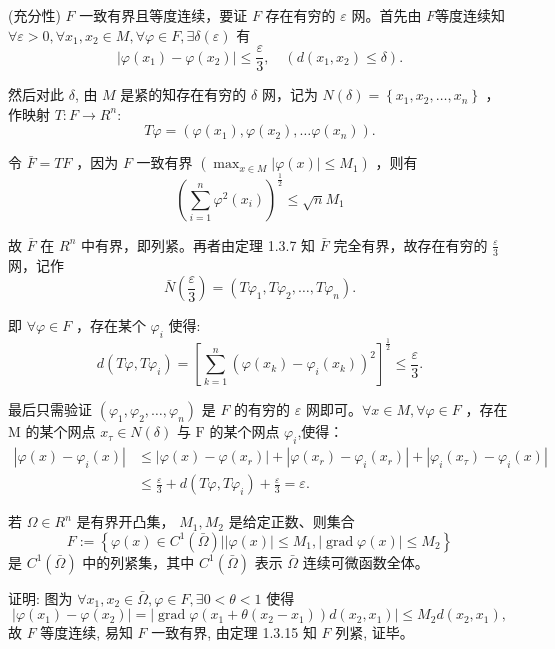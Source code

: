 \begin{solution}
    (充分性) $F$ 一致有界且等度连续，要证 $F$ 存在有穷的 $\varepsilon$ 网。首先由 $F$等度连续知 $\forall \varepsilon>0, \forall x_1, x_2 \in M, \forall \varphi \in F, \exists \delta(\varepsilon)$ 有
    $$
        \left|\varphi\left(x_1\right)-\varphi\left(x_2\right)\right| \leq \frac{\varepsilon}{3}, \quad\left(d\left(x_1, x_2\right) \leq \delta\right) .
    $$

    然后对此 $\delta$, 由 $M$ 是紧的知存在有穷的 $\delta$ 网，记为 $N(\delta)=\left\{x_1, x_2, \ldots, x_n\right\}$ ，作映射 $T: F \rightarrow R^n:$
    $$
        T \varphi=\left(\varphi\left(x_1\right), \varphi\left(x_2\right), \ldots \varphi\left(x_n\right)\right) .
    $$

    令 $\bar{F}=T F$ ，因为 $F$ 一致有界 $\left(\max _{x \in M}|\varphi(x)| \leq M_1\right)$ ，则有
    $$
        \left(\sum_{i=1}^n \varphi^2\left(x_i\right)\right)^{\frac{1}{2}} \leq \sqrt{n} M_1
    $$

    故 $\bar{F}$ 在 $R^n$ 中有界，即列紧。再者由定理 1.3.7 知 $\bar{F}$ 完全有界，故存在有穷的 $\frac{\varepsilon}{3}$ 网，记作
    $$
        \bar{N}\left(\frac{\varepsilon}{3}\right)=\left(T \varphi_1, T \varphi_2, \ldots, T \varphi_n\right) .
    $$

    即 $\forall \varphi \in F$ ，存在某个 $\varphi_i$ 使得:
    $$
        d\left(T \varphi, T \varphi_i\right)=\left[\sum_{k=1}^n\left(\varphi\left(x_k\right)-\varphi_i\left(x_k\right)\right)^2\right]^{\frac{1}{2}} \leq \frac{\varepsilon}{3} .
    $$

    最后只需验证 $\left(\varphi_1, \varphi_2, \ldots, \varphi_n\right)$ 是 $F$ 的有穷的 $\varepsilon$ 网即可。$\forall x \in M, \forall \varphi \in F$ ，存在 $\mathrm{M}$ 的某个网点 $x_\tau \in N(\delta)$ 与 $\mathrm{F}$ 的某个网点 $\varphi_i$,使得：
    $$
    \begin{aligned}
        \left|\varphi(x)-\varphi_i(x)\right| & \leq\left|\varphi(x)-\varphi\left(x_r\right)\right|+\left|\varphi\left(x_r\right)-\varphi_i\left(x_r\right)\right|+\left|\varphi_i\left(x_\tau\right)-\varphi_i(x)\right| \\
        & \leq \frac{\varepsilon}{3}+d\left(T \varphi, T \varphi_i\right)+\frac{\varepsilon}{3}=\varepsilon .
    \end{aligned}
    $$
\end{solution}

\begin{example}
    若 $\Omega \in R^n$ 是有界开凸集， $M_1, M_2$ 是给定正数、则集合
    $$
        F:=\left\{\varphi(x) \in C^1(\bar{\Omega})|| \varphi(x)\left|\leq M_1,\right| \operatorname{grad} \varphi(x) \mid \leq M_2\right\}
    $$
    是 $C^1(\bar{\Omega})$ 中的列紧集，其中 $C^1(\bar{\Omega})$ 表示 $\bar{\Omega}$ 连续可微函数全体。
\end{example}
\begin{solution}
    证明: 图为 $\forall x_1, x_2 \in \bar{\Omega}, \varphi \in F, \exists 0<\theta<1$ 使得
    $$
        \left|\varphi\left(x_1\right)-\varphi\left(x_2\right)\right|=\left|\operatorname{grad} \varphi\left(x_1+\theta\left(x_2-x_1\right)\right) d\left(x_2, x_1\right)\right| \leq M_2 d\left(x_2, x_1\right),
    $$
    故 $F$ 等度连续, 易知 $F$ 一致有界, 由定理 1.3.15 知 $F$ 列紧, 证毕。
\end{solution}

